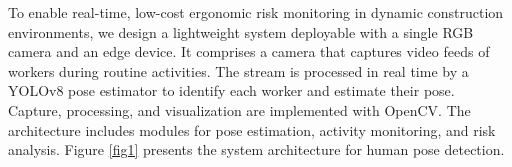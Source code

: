 \documentclass[11pt]{article}
\begin{document}
To enable real-time, low-cost ergonomic risk monitoring in dynamic construction environments, we design a lightweight system deployable with a single RGB camera and an edge device. It comprises a camera that captures video feeds of workers during routine activities. The stream is processed in real time by a YOLOv8 pose estimator to identify each worker and estimate their pose. Capture, processing, and visualization are implemented with OpenCV. The architecture includes modules for pose estimation, activity monitoring, and risk analysis. Figure \ref{fig1} presents the system architecture for human pose detection. 

\end{document}
